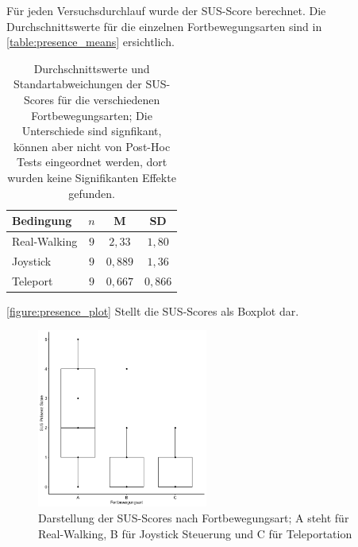                     Für jeden Versuchsdurchlauf wurde der SUS-Score berechnet. Die Durchschnittswerte für die einzelnen Fortbewegungsarten sind in \autoref{table:presence_means} ersichtlich.

                    \begin{table}[!h]
                        \renewcommand\arraystretch{1.2}
                        \centering
                        \begin{tabular}{lccc} \toprule
                            Bedingung       & $n$ & M       & SD     \\ \midrule
                            Real-Walking    & $9$ & $2,33 $ & $1,80$ \\
                            Joystick        & $9$ & $0,889$ & $1,36$ \\
                            Teleport        & $9$ & $0,667$ & $0,866$ \\ \bottomrule
                        \end{tabular}
                        \caption{Durchschnittswerte und Standartabweichungen der SUS-Scores für die verschiedenen Fortbewegungsarten; Die Unterschiede sind signfikant, können aber nicht von Post-Hoc Tests eingeordnet werden, dort wurden keine Signifikanten Effekte gefunden.} \label{table:presence_means}
                    \end{table}

                    \autoref{figure:presence_plot} Stellt die SUS-Scores als Boxplot dar. %

                    \begin{figure}[!h]
                        \centering
                        \includegraphics[width=0.5\textwidth]{plots/presence_plot.png}
                        \caption{Darstellung der SUS-Scores nach Fortbewegungsart;  A steht für Real-Walking, B für Joystick Steuerung und C für Teleportation}\label{figure:presence_plot}
                    \end{figure}

